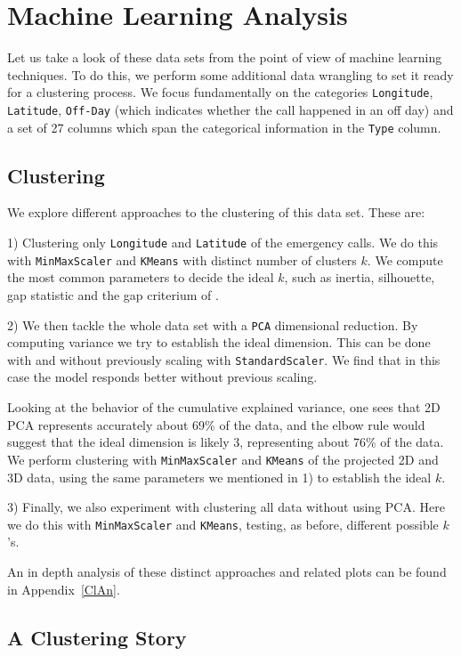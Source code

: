 \documentclass[12pt,a4paper]{article}
\begin{document}
\section{Machine Learning Analysis}


Let us take a look of these data sets from the point of view of machine learning techniques. To do this, we perform some additional data wrangling to set it ready for a clustering process. We focus fundamentally on the categories \verb|Longitude|, \verb|Latitude|, \verb|Off-Day| (which indicates whether the call happened in an off day) and a set of 27 columns which span the categorical information in the \verb|Type| column.

\subsection{Clustering}

We explore different approaches to the clustering of this data set. These are:

1) Clustering only \verb|Longitude| and \verb|Latitude| of the emergency calls. We do this with \verb|MinMaxScaler| and \verb|KMeans| with distinct number of clusters $k$. We compute the most common parameters to decide the ideal $k$, such as inertia, silhouette, gap statistic and the gap criterium of \cite{Tibshirani}.

2) We then tackle the whole data set with a \verb|PCA| dimensional reduction. By computing variance we try to establish the ideal dimension. This can be done with and without previously scaling with \verb|StandardScaler|. We find that in this case the model responds better without previous scaling.

Looking at the behavior of the cumulative explained variance, one sees that 2D PCA represents accurately about 69\% of the data, and the elbow rule would suggest that the ideal dimension is likely 3, representing about 76\% of the data. We perform clustering with \verb|MinMaxScaler| and \verb|KMeans| of the projected 2D and 3D data, using the same parameters we mentioned in 1) to establish the ideal $k$.

3) Finally, we also experiment with clustering all data without using PCA. Here we do this with \verb|MinMaxScaler| and \verb|KMeans|, testing, as before, different possible $k$'s.

An in depth analysis of these distinct approaches and related plots can be found in Appendix~\ref{ClAn}.

\subsection{A Clustering Story}
\end{document}
